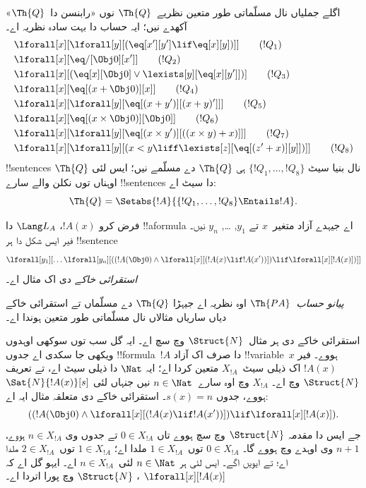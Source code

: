 \documentclass[../../../include/open-logic-section]{subfiles}
\begin{document}
\begin{defn}
اگلے جملیاں نال مسلّماتی
طور متعین نظریے~$\Th{Q}$
نوں «رابنسن دا~$\Th{Q}$»
آکھدے نیں؛ ایہ حساب
دا بہت سادہ نظریہ اے۔
\begin{align*}
& \lforall[x][\lforall[y][(\eq[x'][y'] \lif \eq[x][y])]] \tag{$!Q_1$}\\
& \lforall[x][\eq/[\Obj 0][x']] \tag{$!Q_2$}\\
& \lforall[x][(\eq[x][\Obj 0] \lor \lexists[y][\eq[x][y']])] \tag{$!Q_3$}\\
& \lforall[x][\eq[(x + \Obj 0)][x]] \tag{$!Q_4$}\\
& \lforall[x][\lforall[y][\eq[(x + y')][(x + y)']]] \tag{$!Q_5$}\\
& \lforall[x][\eq[(x \times \Obj 0)][\Obj 0]] \tag{$!Q_6$}\\
& \lforall[x][\lforall[y][\eq[(x \times y')][((x \times y) + x)]]] \tag{$!Q_7$}\\
& \lforall[x][\lforall[y][(x < y \liff \lexists[z][\eq[(z' + x)][y]])]] \tag{$!Q_8$}
\end{align*}
!!{sentence}s نال بنیا سیٹ
$\{!Q_1, \dots, !Q_8\}$
ہی $\Th{Q}$ دے مسلّمے
نیں؛ ایس لئی $\Th{Q}$
اوہناں توں نکلن والے
سارے !!{sentence}s
دا سیٹ اے:
\[
\Th{Q} = \Setabs{!A}{\{!Q_1, \dots, !Q_8\} \Entails !A}.
\]
\end{defn}

\begin{defn}
فرض کرو $!A(x)$،
$\Lang L_A$ دا
!!a{formula} اے جیہدے
آزاد متغیر~$x$ تے
$y_1$, \dots, $y_n$
نیں۔ فیر ایس شکل دا
ہر !!{sentence}
\[
\lforall[y_1][\dots\lforall[y_n][((!A(\Obj 0) \land \lforall[x][(!A(x)
\lif !A(x'))]) \lif \lforall[x][!A(x)])]]
\]
\emph{استقرائی خاکے}
دی اک مثال اے۔

\emph{پیانو حساب}~$\Th{PA}$
اوہ نظریہ اے جیہڑا
$\Th{Q}$ دے مسلّماں
تے استقرائی خاکے
دیاں ساریاں مثالاں
نال مسلّماتی طور
متعین ہوندا اے۔
\end{defn}

\begin{explain}
استقرائی خاکے دی ہر
مثال~$\Struct{N}$
وچ سچ اے۔ ایہ گل
سب توں سوکھی اوہدوں
ویکھی جا سکدی اے
جدوں !!{formula}~$!A$
دا صرف اک آزاد
!!{variable}~$x$
ہووے۔ فیر $!A(x)$
اک ذیلی سیٹ~$X_{!A}$
متعین کردا اے؛
ایہ $\Nat$ دا
ذیلی سیٹ اے،
تے تعریف
$\Struct{N}$ وچ اے۔
$X_{!A}$ وچ
اوہ سارے~$n \in \Nat$
نیں جنہاں لئی
$\Sat{N}{!A(x)}[s]$
ہووے، جدوں
$s(x) = n$۔
استقرائی
خاکے دی متعلقہ
مثال ایہ اے:
\[
((!A(\Obj 0) \land \lforall[x][(!A(x) \lif !A(x'))]) \lif 
  \lforall[x][!A(x)]).
\]
جے ایس دا مقدمہ
$\Struct{N}$ وچ
سچ ہووے تاں
$0 \in X_{!A}$
تے جدوں وی
$n \in X_{!A}$
ہووے، $n+1$
وی اوہدے وچ
ہووے گا۔
$0 \in X_{!A}$
توں~$1 \in X_{!A}$
ملدا اے؛
$1 \in X_{!A}$
توں~$2 \in X_{!A}$
ملدا اے؛ تے
ایویں اگے۔
ایس لئی ہر
$n \in \Nat$
لئی~$n \in X_{!A}$
اے۔ ایہو
گل اے کہ
$\lforall[x][!A(x)]$
، $\Struct{N}$
وچ پورا اتردا اے۔
\end{explain}
\end{document}
